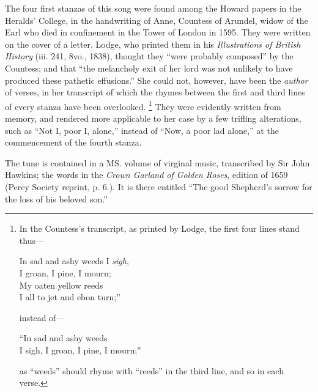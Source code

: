 



The four first stanzas of this song were found among the Howard papers in
the Heralds’ College, in the handwriting of Anne, Countess of Arundel, widow of
the Earl who died in confinement in the Tower of London in 1595. They were
written on the cover of a letter. Lodge, who printed them in his \textit{Illustrations of
British History} (iii. 241, 8vo., 1838), thought they “were probably composed”
by the Countess; and that “the melancholy exit of her lord was not unlikely to
have produced these pathetic effusions.” She could not, however, have been the
\textit{author} of verses, in her transcript of which the rhymes between the first and third
lines of every stanza have been overlooked. \footnote{\textit{}
In the Countess’s transcript, as printed by Lodge,
the first four lines stand thus—
\settowidth{\versewidth}{In sad and ashy weeds I sigh,}
\begin{fnverse}
\begin{altverse}
In sad and ashy weeds I \textit{sigh},\\
I groan, I pine, I mourn;\\
My oaten yellow reeds\\
I all to jet and ebon turn;”
\end{altverse}
\end{fnverse}
instead of—
\begin{fnverse}
\begin{altverse}
“In sad and ashy weeds\\
I sigh, I groan, I pine, I mourn;”
\end{altverse}
\end{fnverse}
as “weeds” should rhyme with “reeds” in the third line,
and so in each verse.}
They were evidently written from
memory, and rendered more applicable to her case by a few trifling alterations,
such as “Not I, poor I, alone,” instead of “Now, a poor lad alone,” at the
commencement of the fourth stanza.

The tune is contained in a MS. volume of virginal music, transcribed by Sir
John Hawkins; the words in the \textit{Crown Garland of Golden Roses}, edition of
1659 (Percy Society reprint, p. 6.). It is there entitled “The good Shepherd’s
sorrow for the loss of his beloved son.”

